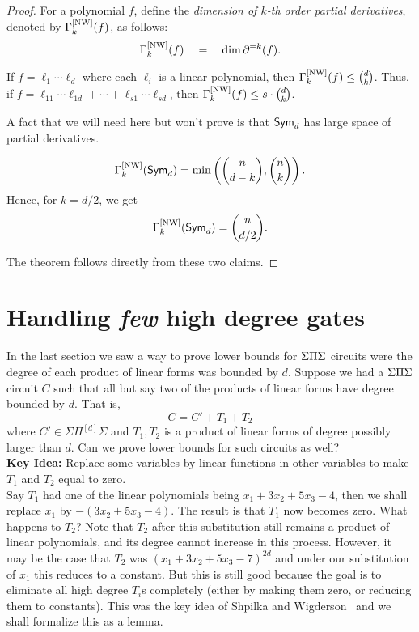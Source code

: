 \begin{proof}
For a polynomial $f$, define the \emph{dimension of $k$-th order partial derivatives}, denoted by $\Gamma^{\mathrm{[NW]}}_k(f)$, as follows:
\[
\Gamma^{\mathrm{[NW]}}_k(f) \quad = \quad \dim \partial^{=k}(f).
\]
\begin{claim}\label{claim:d3-nw-upperbound}
  If $f = \ell_1 \cdots \ell_d$ where each $\ell_i$ is a linear polynomial, then $\Gamma^{\mathrm{[NW]}}_k(f) \leq \binom{d}{k}$. 
  Thus, if $f = \ell_{11}\cdots \ell_{1d} + \cdots + \ell_{s1}\cdots \ell_{sd}$, then $\Gamma^{\mathrm{[NW]}}_k(f) \leq s \cdot \binom{d}{k}$. 
\end{claim}

\noindent
A fact that we will need here but won't prove is that $\operatorname{\mathsf{Sym}}_d$ has large space of partial derivatives.

\begin{claim}
\[
\Gamma^{\mathrm{[NW]}}_k(\operatorname{\mathsf{Sym}}_d) = \min\left(\binom{n}{d-k}, \binom{n}{k}\right).
\]
Hence, for $k = d/2$, we get 
\[
\Gamma^{\mathrm{[NW]}}_k(\operatorname{\mathsf{Sym}}_d) = \binom{n}{d/2}.
\]
\end{claim}

\noindent 
The theorem follows directly from these two claims. \qedhere
\end{proof}

\section{Handling \emph{few} high degree gates}

In the last section we saw a way to prove lower bounds for $\Sigma\Pi\Sigma$ circuits were the degree of each product of linear forms was bounded by $d$. Suppose we had a $\Sigma\Pi\Sigma$ circuit $C$ such that all but say two of the products of linear forms have degree bounded by $d$. That is,
\[
C = C' + T_1 + T_2
\]
where $C' \in \Sigma\Pi^{[d]}\Sigma$ and  $T_1,T_2$ is a product of linear forms of degree possibly larger than $d$. Can we prove lower bounds for such circuits as well? \\

{\bf Key Idea: } Replace some variables by linear functions in other variables to make $T_1$ and $T_2$ equal to zero. \\

Say $T_1$ had one of the linear polynomials being $x_1 + 3x_2 + 5x_3 - 4$, then we shall replace $x_1$ by $- (3x_2 + 5x_3 - 4)$.
The result is that $T_1$ now becomes zero.
What happens to $T_2$?
Note that $T_2$ after this substitution still remains a product of linear polynomials, and its degree cannot increase in this process.
However, it may be the case that $T_2$ was $(x_1 + 3x_2 + 5x_3 - 7)^{2d}$ and under our substitution of $x_1$ this reduces to a constant.
But this is still good because the goal is to eliminate all high degree $T_i$s completely (either by making them zero, or reducing them to constants).
This was the key idea of Shpilka and Wigderson~\cite{sw2001} and we shall formalize this as a lemma.

